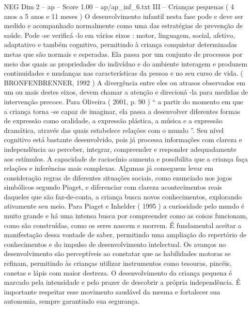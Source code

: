 \begin{textsample}{NEG Dim 2 – ap – Score 1.00 – ap/ap\_inf\_6.txt}  \label{ex:f2_neg_145}
III – Crianças pequenas ( 4 anos a 5 anos e 11 meses ) O desenvolvimento infantil nesta fase pode e deve ser medido e acompanhado normalmente como uma das estratégias de prevenção de saúde.
Pode -se verificá -lo em vários eixos : motor, linguagem, social, afetivo, adaptativo e também cognitivo, permitindo à criança conquistar determinadas metas que são normais e esperadas.
Ela passa por um conjunto de processos por meio dos quais as propriedades do indivíduo e do ambiente interagem e produzem continuidades e mudanças nas características da pessoa e no seu curso de vida. ( BRONFENBRENNER, 1992 ) A divergência entre eles ou atrasos observados em um ou mais destes eixos, devem chamar a atenção e direcioná -la para medidas de intervenção precoce.
Para Oliveira ( 2001, p. 90 ) “ a partir do momento em que a criança torna -se capaz de imaginar, ela passa a desenvolver diferentes formas de expressão como oralidade, a expressão plástica, a música e a expressão dramática, através das quais estabelece relações com o mundo ”.
Seu nível cognitivo está bastante desenvolvido, pois já processa informações com clareza e independência ao perceber, integrar, compreender e responder adequadamente aos estímulos.
A capacidade de raciocínio aumenta e possibilita que a criança faça relações e inferências mais complexas.
Algumas já conseguem levar em consideração regras de diferentes situações sociais, como enunciado nos jogos simbólicos segundo Piaget, e diferenciar com clareza acontecimentos reais daqueles que são faz-de-conta, a criança busca novos conhecimentos, explorando ativamente seu meio.
Para Piaget e Inhelder ( 1995 ) a curiosidade pelo mundo é muito grande e há uma intensa busca por compreender como as coisas funcionam, como são construídas, como os seres nascem e morrem.
É fundamental aceitar a manifestação dessa vontade de saber, permitindo uma ampliação do repertório de conhecimentos e do impulso de desenvolvimento intelectual.
Os avanços no desenvolvimento são perceptíveis ao constatar que as habilidades motoras se refinam, permitindo às crianças utilizar instrumentos como tesouras, pincéis, canetas e lápis com maior destreza.
O desenvolvimento da criança pequena é marcado pela intensidade e pelo prazer de descobrir a própria independência.
É importante respeitar esse movimento saudável da mesma e fortalecer sua autonomia, sempre garantindo sua segurança.

\end{textsample}
